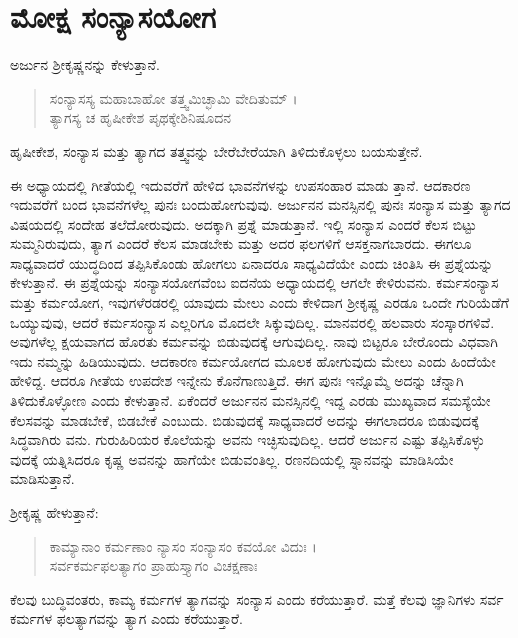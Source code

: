 
\chapter{ಮೋಕ್ಷ ಸಂನ್ಯಾಸಯೋಗ}

ಅರ್ಜುನ ಶ್ರೀಕೃಷ್ಣನನ್ನು ಕೇಳುತ್ತಾನೆ.

\begin{verse}
ಸಂನ್ಯಾಸಸ್ಯ ಮಹಾಬಾಹೋ ತತ್ತ್ವಮಿಚ್ಛಾಮಿ ವೇದಿತುಮ್ ।\\ತ್ಯಾಗಸ್ಯ ಚ ಹೃಷೀಕೇಶ ಪೃಥಕ್ಕೇಶಿನಿಷೂದನ 
\end{verse}

{\small ಹೃಷೀಕೇಶ, ಸಂನ್ಯಾಸ ಮತ್ತು ತ್ಯಾಗದ ತತ್ತ್ವವನ್ನು ಬೇರೆಬೇರೆಯಾಗಿ ತಿಳಿದುಕೊಳ್ಳಲು ಬಯಸುತ್ತೇನೆ.}

ಈ ಅಧ್ಯಾಯದಲ್ಲಿ ಗೀತೆಯಲ್ಲಿ ಇದುವರೆಗೆ ಹೇಳಿದ ಭಾವನೆಗಳನ್ನು ಉಪಸಂಹಾರ ಮಾಡು ತ್ತಾನೆ. ಆದಕಾರಣ ಇದುವರೆಗೆ ಬಂದ ಭಾವನೆಗಳೆಲ್ಲ ಪುನಃ ಬಂದುಹೋಗುವುವು. ಅರ್ಜುನನ ಮನಸ್ಸಿನಲ್ಲಿ ಪುನಃ ಸಂನ್ಯಾಸ ಮತ್ತು ತ್ಯಾಗದ ವಿಷಯದಲ್ಲಿ ಸಂದೇಹ ತಲೆದೋರುವುದು. ಅದಕ್ಕಾಗಿ ಪ್ರಶ್ನೆ ಮಾಡುತ್ತಾನೆ. ಇಲ್ಲಿ ಸಂನ್ಯಾಸ ಎಂದರೆ ಕೆಲಸ ಬಿಟ್ಟು ಸುಮ್ಮನಿರುವುದು, ತ್ಯಾಗ ಎಂದರೆ ಕೆಲಸ ಮಾಡಬೇಕು ಮತ್ತು ಅದರ ಫಲಗಳಿಗೆ ಆಸಕ್ತನಾಗಬಾರದು. ಈಗಲೂ ಸಾಧ್ಯವಾದರೆ ಯುದ್ಧದಿಂದ ತಪ್ಪಿಸಿಕೊಂಡು ಹೋಗಲು ಏನಾದರೂ ಸಾಧ್ಯವಿದೆಯೇ ಎಂದು ಚಿಂತಿಸಿ ಈ ಪ್ರಶ್ನೆಯನ್ನು ಕೇಳುತ್ತಾನೆ. ಈ ಪ್ರಶ್ನೆಯನ್ನು ಸಂನ್ಯಾಸಯೋಗವೆಂಬ ಐದನೆಯ ಅಧ್ಯಾಯದಲ್ಲಿ ಆಗಲೇ ಕೇಳಿರುವನು. ಕರ್ಮಸಂನ್ಯಾಸ ಮತ್ತು ಕರ್ಮಯೋಗ, ಇವುಗಳೆರಡರಲ್ಲಿ ಯಾವುದು ಮೇಲು ಎಂದು ಕೇಳಿದಾಗ ಶ್ರೀಕೃಷ್ಣ ಎರಡೂ ಒಂದೇ ಗುರಿಯೆಡೆಗೆ ಒಯ್ಯುವುವು, ಆದರೆ ಕರ್ಮಸಂನ್ಯಾಸ ಎಲ್ಲರಿಗೂ ಮೊದಲೇ ಸಿಕ್ಕುವುದಿಲ್ಲ. ಮಾನವರಲ್ಲಿ ಹಲವಾರು ಸಂಸ್ಕಾರಗಳಿವೆ. ಅವುಗಳೆಲ್ಲ ಕ್ಷಯವಾಗದ ಹೊರತು ಕರ್ಮವನ್ನು ಬಿಡುವುದಕ್ಕೆ ಆಗುವುದಿಲ್ಲ. ನಾವು ಬಿಟ್ಟರೂ ಬೇರೊಂದು ವಿಧವಾಗಿ ಇದು ನಮ್ಮನ್ನು ಹಿಡಿಯುವುದು. ಆದಕಾರಣ ಕರ್ಮಯೋಗದ ಮೂಲಕ ಹೋಗುವುದು ಮೇಲು ಎಂದು ಹಿಂದೆಯೇ ಹೇಳಿದ್ದ. ಆದರೂ ಗೀತೆಯ ಉಪದೇಶ ಇನ್ನೇನು ಕೊನೆಗಾಣುತ್ತಿದೆ. ಈಗ ಪುನಃ ಇನ್ನೊಮ್ಮೆ ಅದನ್ನು ಚೆನ್ನಾಗಿ ತಿಳಿದುಕೊಳ್ಳೋಣ ಎಂದು ಕೇಳುತ್ತಾನೆ. ಏಕೆಂದರೆ ಅರ್ಜುನನ ಮನಸ್ಸಿನಲ್ಲಿ ಇದ್ದ ಎರಡು ಮುಖ್ಯವಾದ ಸಮಸ್ಯೆಯೇ ಕೆಲಸವನ್ನು ಮಾಡಬೇಕೆ, ಬಿಡಬೇಕೆ ಎಂಬುದು. ಬಿಡುವುದಕ್ಕೆ ಸಾಧ್ಯವಾದರೆ ಅದನ್ನು ಈಗಲಾದರೂ ಬಿಡುವುದಕ್ಕೆ ಸಿದ್ಧವಾಗಿರು ವನು. ಗುರುಹಿರಿಯರ ಕೊಲೆಯನ್ನು ಅವನು ಇಚ್ಛಿಸುವುದಿಲ್ಲ. ಆದರೆ ಅರ್ಜುನ ಎಷ್ಟು ತಪ್ಪಿಸಿಕೊಳ್ಳು ವುದಕ್ಕೆ ಯತ್ನಿಸಿದರೂ ಕೃಷ್ಣ ಅವನನ್ನು ಹಾಗೆಯೇ ಬಿಡುವಂತಿಲ್ಲ. ರಣನದಿಯಲ್ಲಿ ಸ್ನಾನವನ್ನು ಮಾಡಿಸಿಯೇ ಮಾಡಿಸುತ್ತಾನೆ.

ಶ್ರೀಕೃಷ್ಣ ಹೇಳುತ್ತಾನೆ:

\begin{verse}
ಕಾಮ್ಯಾನಾಂ ಕರ್ಮಣಾಂ ನ್ಯಾಸಂ ಸಂನ್ಯಾಸಂ ಕವಯೋ ವಿದುಃ ।\\ಸರ್ವಕರ್ಮಫಲತ್ಯಾಗಂ ಪ್ರಾಹುಸ್ತ್ಯಾಗಂ ವಿಚಕ್ಷಣಾಃ 
\end{verse}

{\small ಕೆಲವು ಬುದ್ಧಿವಂತರು, ಕಾಮ್ಯ ಕರ್ಮಗಳ ತ್ಯಾಗವನ್ನು ಸಂನ್ಯಾಸ ಎಂದು ಕರೆಯುತ್ತಾರೆ. ಮತ್ತೆ ಕೆಲವು ಜ್ಞಾನಿಗಳು ಸರ್ವ ಕರ್ಮಗಳ ಫಲತ್ಯಾಗವನ್ನು ತ್ಯಾಗ ಎಂದು ಕರೆಯುತ್ತಾರೆ.}

